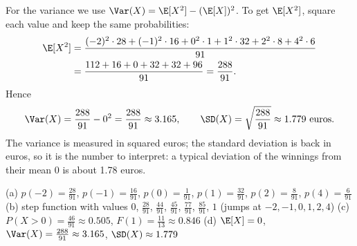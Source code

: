 \begin{solution}
	For the variance we use $\Var(X)=\E[X^2]-(\E[X])^2$. To get $\E[X^2]$,
	square each value and keep the same probabilities:
	\[ \begin{aligned}
			\E[X^2] & =\frac{(-2)^2\cdot28+(-1)^2\cdot16+0^2\cdot1+1^2\cdot32
			+2^2\cdot8+4^2\cdot6}{91} \\
			        & =\frac{112+16+0+32+32+96}{91}=\frac{288}{91}.
		\end{aligned} \]
	Hence
	\[ \Var(X)=\frac{288}{91}-0^2=\frac{288}{91}\approx3.165,\qquad
		\SD(X)=\sqrt{\frac{288}{91}}\approx1.779 \text{ euros}. \]
	The variance is measured in squared euros; the standard deviation is back
	in euros, so it is the number to interpret: a typical deviation of the
	winnings from their mean 0 is about 1.78 euros.
	\begin{answer}
		(a) $p(-2)=\frac{28}{91}$, $p(-1)=\frac{16}{91}$, $p(0)=\frac{1}{91}$,
		$p(1)=\frac{32}{91}$, $p(2)=\frac{8}{91}$, $p(4)=\frac{6}{91}$
		\quad (b) step function with values $0$, $\frac{28}{91}$, $\frac{44}{91}$,
		$\frac{45}{91}$, $\frac{77}{91}$, $\frac{85}{91}$, $1$ (jumps at
		$-2,-1,0,1,2,4$)
		\quad (c) $P(X>0)=\frac{46}{91}\approx0.505$, $F(1)=\frac{11}{13}\approx0.846$
		\quad (d) $\E[X]=0$, $\Var(X)=\frac{288}{91}\approx3.165$,
		$\SD(X)\approx1.779$
	\end{answer}
\end{solution}
